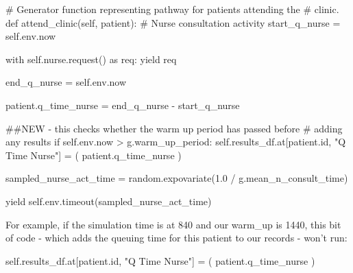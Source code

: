 \documentclass[
  letterpaper,
  DIV=11,
  numbers=noendperiod]{scrreprt}
\newenvironment{Shaded}{\begin{snugshade}}{\end{snugshade}}
\newcommand{\BuiltInTok}[1]{\textcolor[rgb]{0.00,0.23,0.31}{#1}}
\newcommand{\CommentTok}[1]{\textcolor[rgb]{0.37,0.37,0.37}{#1}}
\newcommand{\ControlFlowTok}[1]{\textcolor[rgb]{0.00,0.23,0.31}{#1}}
\newcommand{\FloatTok}[1]{\textcolor[rgb]{0.68,0.00,0.00}{#1}}
\newcommand{\ImportTok}[1]{\textcolor[rgb]{0.00,0.46,0.62}{#1}}
\newcommand{\KeywordTok}[1]{\textcolor[rgb]{0.00,0.23,0.31}{#1}}
\newcommand{\NormalTok}[1]{\textcolor[rgb]{0.00,0.23,0.31}{#1}}
\newcommand{\OperatorTok}[1]{\textcolor[rgb]{0.37,0.37,0.37}{#1}}
\newcommand{\StringTok}[1]{\textcolor[rgb]{0.13,0.47,0.30}{#1}}
\newcommand{\VariableTok}[1]{\textcolor[rgb]{0.07,0.07,0.07}{#1}}
\begin{document}
\label{attend_clinic_func}
\begin{Shaded}
\begin{Highlighting}[]
\CommentTok{\# Generator function representing pathway for patients attending the}
\CommentTok{\# clinic.}
\KeywordTok{def}\NormalTok{ attend\_clinic(}\VariableTok{self}\NormalTok{, patient):}
    \CommentTok{\# Nurse consultation activity}
\NormalTok{    start\_q\_nurse }\OperatorTok{=} \VariableTok{self}\NormalTok{.env.now}

    \ControlFlowTok{with} \VariableTok{self}\NormalTok{.nurse.request() }\ImportTok{as}\NormalTok{ req:}
        \ControlFlowTok{yield}\NormalTok{ req}

\NormalTok{        end\_q\_nurse }\OperatorTok{=} \VariableTok{self}\NormalTok{.env.now}

\NormalTok{        patient.q\_time\_nurse }\OperatorTok{=}\NormalTok{ end\_q\_nurse }\OperatorTok{{-}}\NormalTok{ start\_q\_nurse}

        \CommentTok{\#\#NEW {-} this checks whether the warm up period has passed before}
        \CommentTok{\# adding any results}
        \ControlFlowTok{if} \VariableTok{self}\NormalTok{.env.now }\OperatorTok{\textgreater{}}\NormalTok{ g.warm\_up\_period:}
            \VariableTok{self}\NormalTok{.results\_df.at[patient.}\BuiltInTok{id}\NormalTok{, }\StringTok{"Q Time Nurse"}\NormalTok{] }\OperatorTok{=}\NormalTok{ (}
\NormalTok{                patient.q\_time\_nurse}
\NormalTok{            )}

\NormalTok{        sampled\_nurse\_act\_time }\OperatorTok{=}\NormalTok{ random.expovariate(}\FloatTok{1.0} \OperatorTok{/}
\NormalTok{                                                    g.mean\_n\_consult\_time)}

        \ControlFlowTok{yield} \VariableTok{self}\NormalTok{.env.timeout(sampled\_nurse\_act\_time)}
\end{Highlighting}
\end{Shaded}

For example, if the simulation time is at 840 and our warm\_up is 1440,
this bit of code - which adds the queuing time for this patient to our
records - won't run:

\label{warm_up_bypassed_code}
\begin{Shaded}
\begin{Highlighting}[]
\VariableTok{self}\NormalTok{.results\_df.at[patient.}\BuiltInTok{id}\NormalTok{, }\StringTok{"Q Time Nurse"}\NormalTok{] }\OperatorTok{=}\NormalTok{ (}
\NormalTok{    patient.q\_time\_nurse}
\NormalTok{)}
\end{Highlighting}
\end{Shaded}
\end{document}
